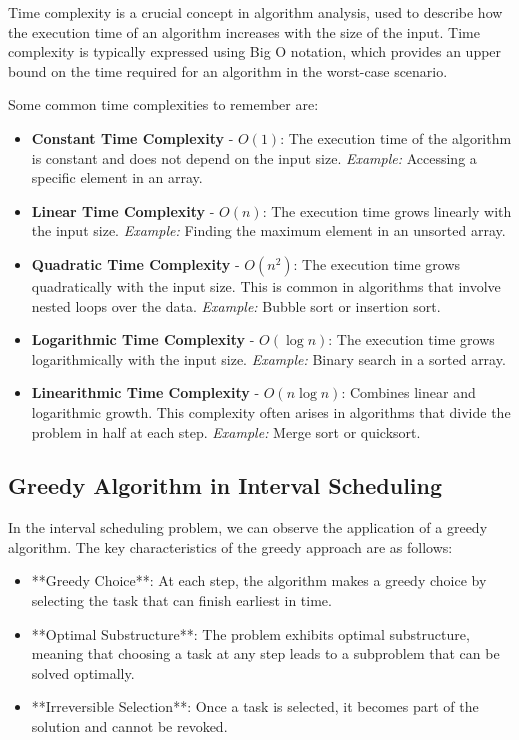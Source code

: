 \documentclass{article}
\begin{document}
Time complexity is a crucial concept in algorithm analysis, used to describe how the execution time of an algorithm increases with the size of the input. Time complexity is typically expressed using Big O notation, which provides an upper bound on the time required for an algorithm in the worst-case scenario.

Some common time complexities to remember are:

\begin{itemize}
    \item \textbf{Constant Time Complexity} - \(O(1)\): The execution time of the algorithm is constant and does not depend on the input size. 
    \textit{Example:} Accessing a specific element in an array.

    \item \textbf{Linear Time Complexity} - \(O(n)\): The execution time grows linearly with the input size. 
    \textit{Example:} Finding the maximum element in an unsorted array.

    \item \textbf{Quadratic Time Complexity} - \(O(n^2)\): The execution time grows quadratically with the input size. This is common in algorithms that involve nested loops over the data.
    \textit{Example:} Bubble sort or insertion sort.

    \item \textbf{Logarithmic Time Complexity} - \(O(\log n)\): The execution time grows logarithmically with the input size. 
    \textit{Example:} Binary search in a sorted array.

    \item \textbf{Linearithmic Time Complexity} - \(O(n \log n)\): Combines linear and logarithmic growth. This complexity often arises in algorithms that divide the problem in half at each step. 
    \textit{Example:} Merge sort or quicksort.
\end{itemize}
\subsection{Greedy Algorithm in Interval Scheduling}

In the interval scheduling problem, we can observe the application of a greedy algorithm. The key characteristics of the greedy approach are as follows:

\begin{itemize}
    \item **Greedy Choice**: At each step, the algorithm makes a greedy choice by selecting the task that can finish earliest in time.
    
    \item **Optimal Substructure**: The problem exhibits optimal substructure, meaning that choosing a task at any step leads to a subproblem that can be solved optimally.
    
    \item **Irreversible Selection**: Once a task is selected, it becomes part of the solution and cannot be revoked.
\end{itemize}
\end{document}
